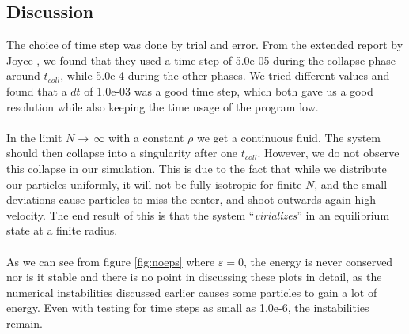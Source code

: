 \documentclass{article}
\begin{document}
\subsection{Discussion}
The choice of time step was done by trial and error. From the extended report by Joyce \cite{JoyceFull}, we found that they used a time step of 5.0e-05 during the collapse phase around $t_{coll}$, while 5.0e-4 during the other phases. We tried different values and found that a $dt$ of 1.0e-03 was a good time step, which both gave us a good resolution while also keeping the time usage of the program low.\\\\
In the limit $N \rightarrow \, \infty$ with a constant $\rho$ we get a continuous fluid. The system should then collapse into a singularity after one $t_{coll}$. However, we do not observe this collapse in our simulation. This is due to the fact that while we distribute our particles uniformly, it will not be fully isotropic for finite $N$, and the small deviations cause particles to miss the center, and shoot outwards again high velocity. The end result of this is that the system ``\textit{virializes}'' in an equilibrium state at a finite radius.%
\\ \\
As we can see from figure \ref{fig:noeps} where $\varepsilon = 0$, the energy is never conserved nor is it stable and there is no point in discussing these plots in detail, as the numerical instabilities discussed earlier causes some particles to gain a lot of energy. Even with testing for time steps as small as 1.0e-6, the instabilities remain.
\\\\
\end{document}

